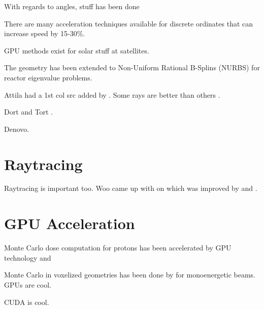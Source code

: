 With regards to angles, stuff has been done \citep{ref:ahrensc}

There are many acceleration techniques available for discrete ordinates \citep{ref:efremenkod} that can increase speed by 15-30\%.

GPU methods exist for solar stuff at satellites.

The geometry has been extended to Non-Uniform Rational B-Splins (NURBS) for reactor eigenvalue problems.

Attila had a 1st col src added by \citep{ref:wareingt}. Some rays are better than others \citep{ref:mathewsk}.

Dort and Tort \citep{ref:rhoadesw}.

Denovo.

\section{Raytracing}

Raytracing is important too. Woo came up with on \citep{ref:wooa} which was improved by \citet{ref:liuy} and \citet{ref:hel}.

\section{GPU Acceleration}

Monte Carlo dose computation for protons has been accelerated by GPU technology \citep{ref:jiax} and 

Monte Carlo in voxelized geometries has been done by \citep{ref:hissoinys} for monoenergetic beams.
GPUs are cool.

CUDA is cool.


\endinput

